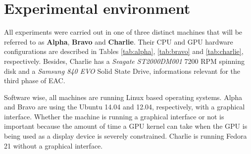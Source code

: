 \section{Experimental environment}
\label{sec:system configs}

All experiments were carried out in one of three distinct machines that will be referred to as \textbf{Alpha}, \textbf{Bravo} and \textbf{Charlie}.
Their CPU and GPU hardware configurations are described in Tables \ref{tab:alpha}, \ref{tab:bravo} and \ref{tab:charlie}, respectively.
Besides, Charlie has a \emph{Seagate ST2000DM001} 7200 RPM spinning disk and a \emph{Samsung 840 EVO} Solid State Drive, informations relevant for the third phase of EAC.%

Software wise, all machines are running Linux based operating systems.
Alpha and Bravo are using the Ubuntu 14.04 and 12.04, respectively, with a graphical interface.
Whether the machine is running a graphical interface or not is important because the amount of time a GPU kernel can take when the GPU is being used as a display device is severely constrained. %
Charlie is running Fedora 21 without a graphical interface.





